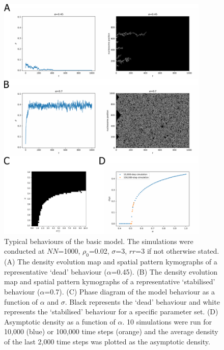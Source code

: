 \begin{figure}[htbp]
  \centering
  \includegraphics[width=0.9\textwidth]{chapter2/figures/model_behaviour.pdf}
  \caption[Typical behaviours of the basic model.]{Typical behaviours of the basic model. The simulations were conducted at $NN$=1000, $\rho_{0}$=0.02, $\sigma$=3, $rr$=3 if not otherwise stated. (A) The density evolution map and spatial pattern kymographs of a representative ‘dead’ behaviour ($\alpha$=0.45). (B) The density evolution map and spatial pattern kymographs of a representative ‘stabilised’ behaviour ($\alpha$=0.7). (C) Phase diagram of the model behaviour as a function of $\alpha$ and $\sigma$. Black represents the ‘dead’ behaviour and white represents the ‘stabilised’ behaviour for a specific parameter set. (D) Asymptotic density as a function of $\alpha$. 10 simulations were run for 10,000 (blue) or 100,000 time steps (orange) and the average density of the last 2,000 time steps was plotted as the asymptotic density. }
  \label{fig:modelBehaviour}
\end{figure}

